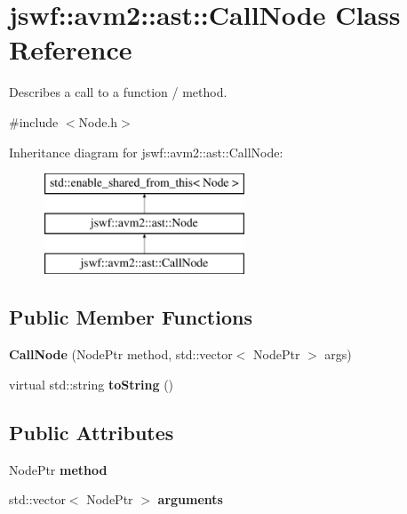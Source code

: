 \hypertarget{classjswf_1_1avm2_1_1ast_1_1_call_node}{\section{jswf\+:\+:avm2\+:\+:ast\+:\+:Call\+Node Class Reference}
\label{classjswf_1_1avm2_1_1ast_1_1_call_node}
}


Describes a call to a function / method.  




{\ttfamily \#include $<$Node.\+h$>$}

Inheritance diagram for jswf\+:\+:avm2\+:\+:ast\+:\+:Call\+Node\+:\begin{figure}[H]
\begin{center}
\leavevmode
\includegraphics[height=3.000000cm]{classjswf_1_1avm2_1_1ast_1_1_call_node}
\end{center}
\end{figure}
\subsection*{Public Member Functions}
\begin{DoxyCompactItemize}
\item 
\hypertarget{classjswf_1_1avm2_1_1ast_1_1_call_node_a5f2357c66a001cd7adcdfe9199c2fc0f}{{\bfseries Call\+Node} (Node\+Ptr method, std\+::vector$<$ Node\+Ptr $>$ args)}\label{classjswf_1_1avm2_1_1ast_1_1_call_node_a5f2357c66a001cd7adcdfe9199c2fc0f}

\item 
\hypertarget{classjswf_1_1avm2_1_1ast_1_1_call_node_a30e5d5d240b04bec3141baf4b73e3ad0}{virtual std\+::string {\bfseries to\+String} ()}\label{classjswf_1_1avm2_1_1ast_1_1_call_node_a30e5d5d240b04bec3141baf4b73e3ad0}

\end{DoxyCompactItemize}
\subsection*{Public Attributes}
\begin{DoxyCompactItemize}
\item 
\hypertarget{classjswf_1_1avm2_1_1ast_1_1_call_node_aed18b408f34bd922c48cefee450733ae}{Node\+Ptr {\bfseries method}}\label{classjswf_1_1avm2_1_1ast_1_1_call_node_aed18b408f34bd922c48cefee450733ae}

\item 
\hypertarget{classjswf_1_1avm2_1_1ast_1_1_call_node_ab44f3a4d1823c468ebbf2fb5880d7c26}{std\+::vector$<$ Node\+Ptr $>$ {\bfseries arguments}}\label{classjswf_1_1avm2_1_1ast_1_1_call_node_ab44f3a4d1823c468ebbf2fb5880d7c26}

\end{DoxyCompactItemize}


